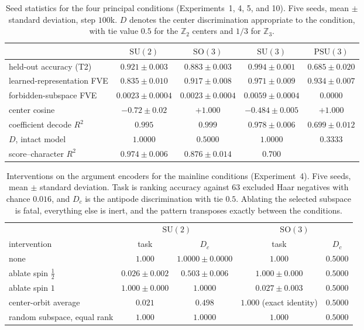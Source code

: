 \documentclass{article}
\newcommand{\SU}{\mathrm{SU}}
\newcommand{\SO}{\mathrm{SO}}
\newcommand{\PSU}{\mathrm{PSU}}
\newcommand{\Z}{\mathbb{Z}}
\begin{document}
\begin{table}[t]
\centering
\caption{Seed statistics for the four principal conditions
(Experiments~1, 4, 5, and 10). Five seeds, mean $\pm$ standard
deviation, step $100$k. $D$ denotes the center discrimination
appropriate to the condition, with tie value $0.5$ for the $\Z_2$
centers and $1/3$ for $\Z_3$.}
\label{tab:seeds}
\scriptsize
\setlength{\tabcolsep}{4pt}
\begin{tabular}{lcccc}
\toprule
 & $\SU(2)$ & $\SO(3)$ & $\SU(3)$ & $\PSU(3)$ \\
\midrule
held-out accuracy (T2) & $0.921 \pm 0.003$ & $0.883 \pm 0.003$ & $0.994 \pm 0.001$ & $0.685 \pm 0.020$ \\
learned-representation FVE & $0.835 \pm 0.010$ & $0.917 \pm 0.008$ & $0.971 \pm 0.009$ & $0.934 \pm 0.007$ \\
forbidden-subspace FVE & $0.0023 \pm 0.0004$ & $0.0023 \pm 0.0004$ & $0.0059 \pm 0.0004$ & $0.0000$ \\
center cosine & $-0.72 \pm 0.02$ & $+1.000$ & $-0.484 \pm 0.005$ & $+1.000$ \\
coefficient decode $R^2$ & $0.995$ & $0.999$ & $0.978 \pm 0.006$ & $0.699 \pm 0.012$ \\
$D$, intact model & $1.0000$ & $0.5000$ & $1.0000$ & $0.3333$ \\
score--character $R^2$ & $0.974 \pm 0.006$ & $0.876 \pm 0.014$ & $0.700$ & \\
\bottomrule
\end{tabular}
\end{table}

\begin{table}[t]
\centering
\caption{Interventions on the argument encoders for the mainline
conditions (Experiment~4). Five seeds, mean $\pm$ standard deviation.
Task is ranking accuracy against $63$ excluded Haar negatives with
chance $0.016$, and $D_c$ is the antipode discrimination with tie
$0.5$. Ablating the selected subspace is fatal, everything else is
inert, and the pattern transposes exactly between the conditions.}
\label{tab:su2causal}
\scriptsize
\begin{tabular}{lcccc}
\toprule
 & \multicolumn{2}{c}{$\SU(2)$} & \multicolumn{2}{c}{$\SO(3)$} \\
intervention & task & $D_c$ & task & $D_c$ \\
\midrule
none & $1.000$ & $1.0000 \pm 0.0000$ & $1.000$ & $0.5000$ \\
ablate spin $\tfrac12$ & $0.026 \pm 0.002$ & $0.503 \pm 0.006$ & $1.000 \pm 0.000$ & $0.5000$ \\
ablate spin $1$ & $1.000 \pm 0.000$ & $1.0000$ & $0.027 \pm 0.003$ & $0.5000$ \\
center-orbit average & $0.021$ & $0.498$ & $1.000$ (exact identity) & $0.5000$ \\
random subspace, equal rank & $1.000$ & $1.0000$ & $1.000$ & $0.5000$ \\
\bottomrule
\end{tabular}
\end{table}
\end{document}
